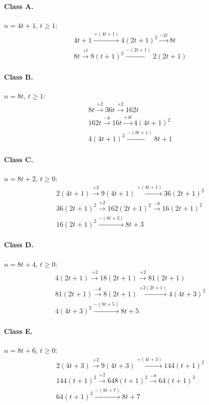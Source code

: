 \paragraph{Class A.} $n=4t+1$, $t\ge 1$:
\begin{gather*}
4 t + 1 \xrightarrow{+\left(4 t + 1\right)} 4 \left(2 t + 1\right)^{2} \xrightarrow{-2 t} 8 t \\
8 t \xrightarrow{+t} 8 \left(t + 1\right)^{2} \xrightarrow{-\left(2 t + 1\right)} 2 \left(2 t + 1\right)
\end{gather*}
\paragraph{Class B.} $n=8t$, $t\ge 1$:
\begin{gather*}
8 t \xrightarrow{+2} 36 t \xrightarrow{+2} 162 t \\
162 t \xrightarrow{-8} 16 t \xrightarrow{+4 t} 4 \left(4 t + 1\right)^{2} \\
4 \left(4 t + 1\right)^{2} \xrightarrow{-\left(8 t + 1\right)} 8 t + 1
\end{gather*}
\paragraph{Class C.} $n=8t+2$, $t\ge 0$:
\begin{gather*}
2 \left(4 t + 1\right) \xrightarrow{+2} 9 \left(4 t + 1\right) \xrightarrow{+\left(4 t + 1\right)} 36 \left(2 t + 1\right)^{2} \\
36 \left(2 t + 1\right)^{2} \xrightarrow{+2} 162 \left(2 t + 1\right)^{2} \xrightarrow{-8} 16 \left(2 t + 1\right)^{2} \\
16 \left(2 t + 1\right)^{2} \xrightarrow{-\left(8 t + 3\right)} 8 t + 3
\end{gather*}
\paragraph{Class D.} $n=8t+4$, $t\ge 0$:
\begin{gather*}
4 \left(2 t + 1\right) \xrightarrow{+2} 18 \left(2 t + 1\right) \xrightarrow{+2} 81 \left(2 t + 1\right) \\
81 \left(2 t + 1\right) \xrightarrow{-8} 8 \left(2 t + 1\right) \xrightarrow{+2 \left(2 t + 1\right)} 4 \left(4 t + 3\right)^{2} \\
4 \left(4 t + 3\right)^{2} \xrightarrow{-\left(8 t + 5\right)} 8 t + 5
\end{gather*}
\paragraph{Class E.} $n=8t+6$, $t\ge 0$:
\begin{gather*}
2 \left(4 t + 3\right) \xrightarrow{+2} 9 \left(4 t + 3\right) \xrightarrow{+\left(4 t + 3\right)} 144 \left(t + 1\right)^{2} \\
144 \left(t + 1\right)^{2} \xrightarrow{+2} 648 \left(t + 1\right)^{2} \xrightarrow{-8} 64 \left(t + 1\right)^{2} \\
64 \left(t + 1\right)^{2} \xrightarrow{-\left(8 t + 7\right)} 8 t + 7
\end{gather*}
